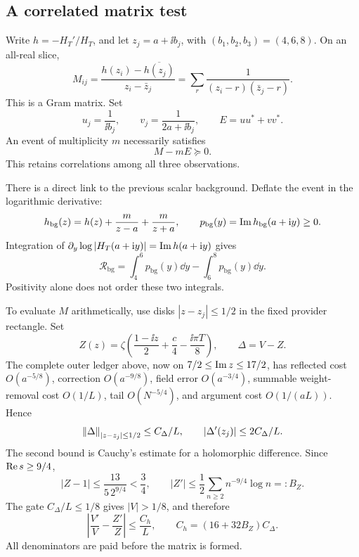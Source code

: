 \subsection{A correlated matrix test}

Write \(h=-H_T'/H_T\), and let \(z_j=a+\ii b_j\), with
\((b_1,b_2,b_3)=(4,6,8)\). On an all-real slice,
\begin{equation}\label{eq:Pick}
 M_{ij}=\frac{h(z_i)-\overline{h(z_j)}}{z_i-\bar z_j}
       =\sum_r\frac1{(z_i-r)(\bar z_j-r)}.
\end{equation}
This is a Gram matrix. Set
\[
 u_j=\frac1{\ii b_j},\qquad v_j=\frac1{2a+\ii b_j},\qquad
 E=uu^*+vv^*.
\]
An event of multiplicity \(m\) necessarily satisfies
\begin{equation}\label{eq:Pickevent}
 M-mE\succeq0.
\end{equation}
This retains correlations among all three observations.

There is a direct link to the previous scalar background. Deflate the
event in the logarithmic derivative:
\[
 h_{\mathrm{bg}}(z)=h(z)+\frac m{z-a}+\frac m{z+a},\qquad
 p_{\mathrm{bg}}(y)=\operatorname{Im} h_{\mathrm{bg}}(a+\mathrm i y)\ge0.
\]
Integration of \(\partial_y\log|H_T(a+\mathrm i y)|=\operatorname{Im} h(a+\mathrm i y)\)
gives
\[
 \mathcal R_{\mathrm{bg}}
   =\int_4^6 p_{\mathrm{bg}}(y)\dd y-\int_6^8p_{\mathrm{bg}}(y)\dd y.
\]
Positivity alone does not order these two integrals.

To evaluate \(M\) arithmetically, use disks
\(|z-z_j|\le1/2\) in the fixed provider rectangle. Set
\[
 Z(z)=\zeta\left(\frac{1-\ii z}{2}+\frac c4-\frac{\ii\pi T}{8}\right),
 \qquad \Delta=V-Z.
\]
The complete outer ledger above, now on \(7/2\le\operatorname{Im} z\le17/2\),
has reflected cost \(O(a^{-5/8})\), correction \(O(a^{-9/8})\),
field error \(O(a^{-3/4})\), summable weight-removal cost \(O(1/L)\),
tail \(O(N^{-5/4})\), and argument cost \(O(1/(aL))\). Hence
\begin{equation}\label{eq:deltaderivative}
 \left\lVert\Delta\right\rVert_{|z-z_j|\le1/2}\le C_\Delta/L,\qquad
 |\Delta'(z_j)|\le2C_\Delta/L.
\end{equation}
The second bound is Cauchy's estimate for a holomorphic difference.
Since \(\operatorname{Re} s\ge9/4\),
\[
 |Z-1|\le \frac{13}{5\,2^{9/4}}<\frac34,\qquad
 |Z'|\le\frac12\sum_{n\ge2}n^{-9/4}\log n=:B_Z.
\]
The gate \(C_\Delta/L\le1/8\) gives \(|V|>1/8\), and therefore
\begin{equation}\label{eq:logdererror}
 \left|\frac{V'}V-\frac{Z'}Z\right|
 \le\frac{C_h}{L},\qquad C_h=(16+32B_Z)C_\Delta.
\end{equation}
All denominators are paid before the matrix is formed.

